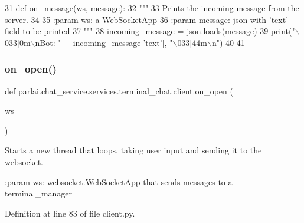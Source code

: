 \begin{DoxyCode}
31 \textcolor{keyword}{def }\hyperlink{namespaceparlai_1_1chat__service_1_1services_1_1terminal__chat_1_1client_a0ef2bb2bd3b966dcdd8402a92b999708}{on\_message}(ws, message):
32     \textcolor{stringliteral}{"""}
33 \textcolor{stringliteral}{    Prints the incoming message from the server.}
34 \textcolor{stringliteral}{}
35 \textcolor{stringliteral}{    :param ws: a WebSocketApp}
36 \textcolor{stringliteral}{    :param message: json with 'text' field to be printed}
37 \textcolor{stringliteral}{    """}
38     incoming\_message = json.loads(message)
39     print(\textcolor{stringliteral}{"\(\backslash\)033[0m\(\backslash\)nBot: "} + incoming\_message[\textcolor{stringliteral}{'text'}], \textcolor{stringliteral}{"\(\backslash\)033[44m\(\backslash\)n"})
40 
41 
\end{DoxyCode}
\mbox{\label{namespaceparlai_1_1chat__service_1_1services_1_1terminal__chat_1_1client_a9186bee0436623cc10a378752ba8a61c}} 
\subsubsection{\texorpdfstring{on\+\_\+open()}{on\_open()}}
{\footnotesize\ttfamily def parlai.\+chat\+\_\+service.\+services.\+terminal\+\_\+chat.\+client.\+on\+\_\+open (\begin{DoxyParamCaption}\item[{}]{ws }\end{DoxyParamCaption})}

\begin{DoxyVerb}Starts a new thread that loops, taking user input and sending it to the websocket.

:param ws: websocket.WebSocketApp that sends messages to a terminal_manager
\end{DoxyVerb}
 

Definition at line 83 of file client.\+py.


